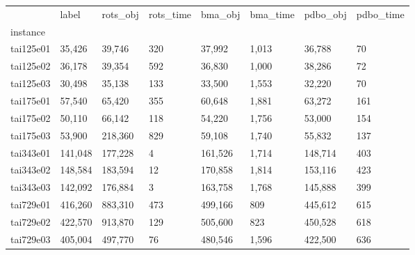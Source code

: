 \begin{tabular}{llllllll}
\toprule
 & label & rots_obj & rots_time & bma_obj & bma_time & pdbo_obj & pdbo_time \\
instance &  &  &  &  &  &  &  \\
\midrule
tai125e01 & 35,426 & 39,746 & 320 & 37,992 & 1,013 & 36,788 & 70 \\
tai125e02 & 36,178 & 39,354 & 592 & 36,830 & 1,000 & 38,286 & 72 \\
tai125e03 & 30,498 & 35,138 & 133 & 33,500 & 1,553 & 32,220 & 70 \\
tai175e01 & 57,540 & 65,420 & 355 & 60,648 & 1,881 & 63,272 & 161 \\
tai175e02 & 50,110 & 66,142 & 118 & 54,220 & 1,756 & 53,000 & 154 \\
tai175e03 & 53,900 & 218,360 & 829 & 59,108 & 1,740 & 55,832 & 137 \\
tai343e01 & 141,048 & 177,228 & 4 & 161,526 & 1,714 & 148,714 & 403 \\
tai343e02 & 148,584 & 183,594 & 12 & 170,858 & 1,814 & 153,116 & 423 \\
tai343e03 & 142,092 & 176,884 & 3 & 163,758 & 1,768 & 145,888 & 399 \\
tai729e01 & 416,260 & 883,310 & 473 & 499,166 & 809 & 445,612 & 615 \\
tai729e02 & 422,570 & 913,870 & 129 & 505,600 & 823 & 450,528 & 618 \\
tai729e03 & 405,004 & 497,770 & 76 & 480,546 & 1,596 & 422,500 & 636 \\
\bottomrule
\end{tabular}
